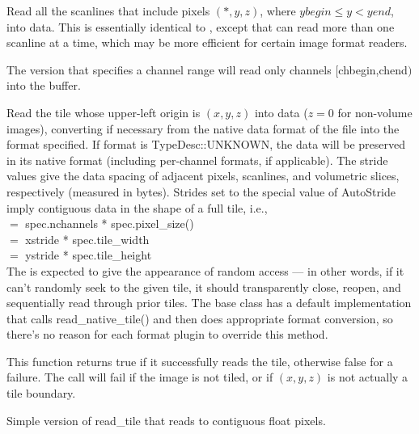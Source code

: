 Read all the scanlines that include pixels $(*,y,z)$, where
$\mathit{ybegin} \le y < \mathit{yend}$, into {\kw data}.  This is 
essentially identical to \readscanline, except that can read more than
one scanline at a time, which may be more efficient for certain image
format readers.

The version that specifies a channel range will read only
channels $[${\cf chbegin},{\cf chend}$)$ into the buffer.
\apiend


Read the tile whose upper-left origin is $(x,y,z)$ into {\kw data}
($z=0$ for non-volume images),
converting if necessary from the native data format of the file into the 
{\kw format} specified.
If {\cf format} is {\cf TypeDesc::UNKNOWN}, the data will be preserved 
in its native format (including per-channel formats, if applicable).
The stride values
give the data spacing of adjacent pixels, scanlines, and volumetric
slices, respectively (measured in bytes).  Strides set to the special
value of {\kw AutoStride} imply contiguous data in the shape of a full tile,
i.e., \\
 $=$ {\kw spec.nchannels * spec.pixel_size()} \\
 $=$ {\kw xstride * spec.tile_width} \\
 $=$ {\kw ystride * spec.tile_height} \\
The \ImageInput is expected to give the appearance of random access
--- in other words, if it can't randomly seek to the given tile, it
should transparently close, reopen, and sequentially read through prior
tiles.  The base \ImageInput class has a default implementation
that calls {\cf read_native_tile()} and then does appropriate format conversion,
so there's no reason for each format plugin to override this method.

This function returns {\cf true} if it successfully reads the tile,
otherwise {\cf false} for a failure.
The call will fail if the image is not tiled, or if $(x,y,z)$ is not
actually a tile boundary.
\apiend


Simple version of {\kw read_tile} that reads to contiguous float pixels.
\apiend



